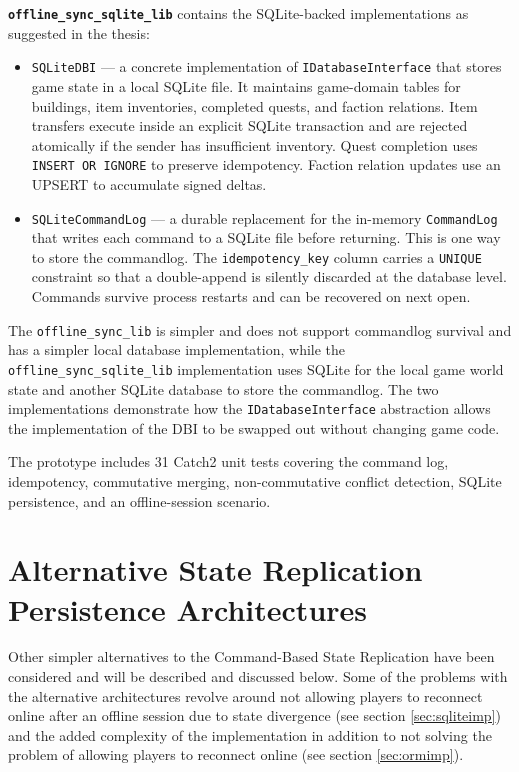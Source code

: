 \documentclass{article}
\begin{document}
\textbf{\texttt{offline\_sync\_sqlite\_lib}} contains the SQLite-backed implementations as suggested in the thesis:
\begin{itemize}
  \item \texttt{SQLiteDBI} — a concrete implementation of \texttt{IDatabaseInterface} that stores game state in a local SQLite file. It maintains game-domain tables for buildings, item inventories, completed quests, and faction relations. Item transfers execute inside an explicit SQLite transaction and are rejected atomically if the sender has insufficient inventory. Quest completion uses \texttt{INSERT OR IGNORE} to preserve idempotency. Faction relation updates use an UPSERT to accumulate signed deltas.
  \item \texttt{SQLiteCommandLog} — a durable replacement for the in-memory \texttt{CommandLog} that writes each command to a SQLite file before returning. This is one way to store the commandlog. The \texttt{idempotency\_key} column carries a \texttt{UNIQUE} constraint so that a double-append is silently discarded at the database level. Commands survive process restarts and can be recovered on next open.
\end{itemize}

The \texttt{offline\_sync\_lib} is simpler and does not support commandlog survival and has a simpler local database implementation, while the \texttt{offline\_sync\_sqlite\_lib} implementation uses SQLite for the local game world state and another SQLite database to store the commandlog. The two implementations demonstrate how the \texttt{IDatabaseInterface} abstraction allows the implementation of the DBI to be swapped out without changing game code.

The prototype includes 31 Catch2 unit tests covering the command log, idempotency, commutative merging, non-commutative conflict detection, SQLite persistence, and an offline-session scenario.

\newpage

\section{Alternative State Replication Persistence Architectures}
\label{sec:alt}

Other simpler alternatives to the Command-Based State Replication have been considered and will be described and discussed below. Some of the problems with the alternative architectures revolve around not allowing players to reconnect online after an offline session due to state divergence (see section \ref{sec:sqliteimp}) and the added complexity of the implementation in addition to not solving the problem of allowing players to reconnect online (see section \ref{sec:ormimp}).
\end{document}
